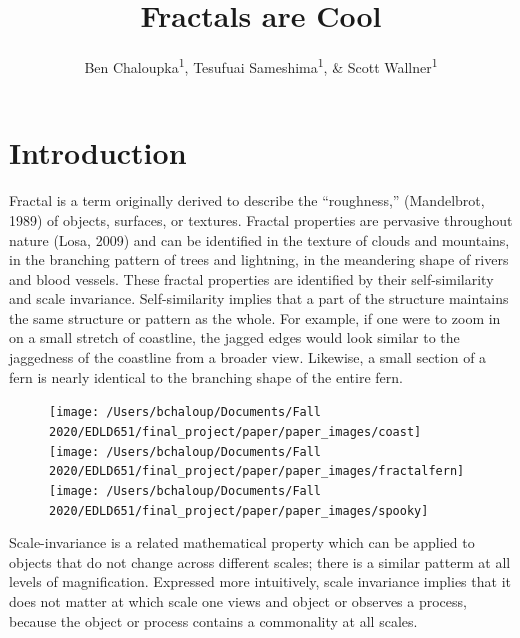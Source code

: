 \documentclass[english,jou]{apa6}
\title{Fractals are Cool}
\author{Ben Chaloupka\textsuperscript{1}, Tesufuai Sameshima\textsuperscript{1}, \& Scott Wallner\textsuperscript{1}}
\date{}
\affiliation{\vspace{0.5cm}\textsuperscript{1} University of Oregon}
\begin{document}
\maketitle

\hypertarget{introduction}{%
\section{Introduction}\label{introduction}}

Fractal is a term originally derived to describe the \enquote{roughness,} (Mandelbrot, 1989) of objects, surfaces, or textures. Fractal properties are pervasive throughout nature (Losa, 2009) and can be identified in the texture of clouds and mountains, in the branching pattern of trees and lightning, in the meandering shape of rivers and blood vessels. These fractal properties are identified by their self-similarity and scale invariance. Self-similarity implies that a part of the structure maintains the same structure or pattern as the whole. For example, if one were to zoom in on a small stretch of coastline, the jagged edges would look similar to the jaggedness of the coastline from a broader view. Likewise, a small section of a fern is nearly identical to the branching shape of the entire fern.

\begin{figure}

{\centering \texttt{[image: /Users/bchaloup/Documents/Fall 2020/EDLD651/final\_project/paper/paper\_images/coast]} \texttt{[image: /Users/bchaloup/Documents/Fall 2020/EDLD651/final\_project/paper/paper\_images/fractalfern]} \texttt{[image: /Users/bchaloup/Documents/Fall 2020/EDLD651/final\_project/paper/paper\_images/spooky]} 

}

\caption{ }\label{fig:unnamed-chunk-1}
\end{figure}

Scale-invariance is a related mathematical property which can be applied to objects that do not change across different scales; there is a similar patterm at all levels of magnification. Expressed more intuitively, scale invariance implies that it does not matter at which scale one views and object or observes a process, because the object or process contains a commonality at all scales.
\end{document}
